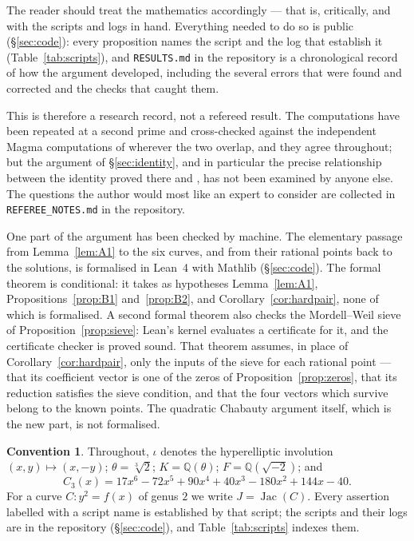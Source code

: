 \documentclass[11pt,reqno]{amsart}
\theoremstyle{plain}
\theoremstyle{definition}
\newtheorem{convention}[theorem]{Convention}
\newcommand{\Q}{\mathbb{Q}}
\DeclareMathOperator{\Jac}{Jac}
\numberwithin{equation}{section}
\begin{document}
The reader should treat the mathematics accordingly --- that is,
critically, and with the scripts and logs in hand. Everything needed to do so is
public (\S\ref{sec:code}): every proposition names the script and the log that
establish it (Table~\ref{tab:scripts}), and \texttt{RESULTS.md} in the
repository is a chronological record of how the argument developed, including
the several errors that were found and corrected and the checks that caught
them.

This is therefore a research record, not a refereed result. The computations
have been repeated at a second prime and cross-checked against the independent
Magma computations of \cite{Villines} wherever the two overlap, and they agree
throughout; but the argument of \S\ref{sec:identity}, and in particular the
precise relationship between the identity proved there and
\cite[Thm.~1.5]{BBBM}, has not been examined by anyone else. The questions the
author would most like an expert to consider are collected in
\texttt{REFEREE\_NOTES.md} in the repository.

One part of the argument has been checked by machine. The elementary passage
from Lemma~\ref{lem:A1} to the six curves, and from their rational points back
to the solutions, is formalised in Lean~4 with Mathlib (\S\ref{sec:code}). The
formal theorem is conditional: it takes as hypotheses Lemma~\ref{lem:A1},
Propositions~\ref{prop:B1} and~\ref{prop:B2}, and
Corollary~\ref{cor:hardpair}, none of which is formalised. A second formal
theorem also checks the Mordell--Weil sieve of Proposition~\ref{prop:sieve}:
Lean's kernel evaluates a certificate for it, and the certificate checker is
proved sound. That theorem assumes, in place of Corollary~\ref{cor:hardpair},
only the inputs of the sieve for each rational point --- that its coefficient
vector is one of the zeros of Proposition~\ref{prop:zeros}, that its reduction
satisfies the sieve condition, and that the four vectors which survive belong to
the known points. The quadratic Chabauty argument
itself, which is the new part, is not formalised.

\begin{convention}
Throughout, $\iota$ denotes the hyperelliptic involution $(x,y)\mapsto(x,-y)$;
$\theta=\sqrt[3]{2}$; $K=\Q(\theta)$; $F=\Q(\sqrt{-2})$; and
\[
  C_{3}(x)=17x^{6}-72x^{5}+90x^{4}+40x^{3}-180x^{2}+144x-40 .
\]
For a curve $C\colon y^{2}=f(x)$ of genus $2$ we write $J=\Jac(C)$. Every
assertion labelled with a script name is established by that script; the
scripts and their logs are in the repository (\S\ref{sec:code}), and
Table~\ref{tab:scripts} indexes them.
\end{convention}
\end{document}
